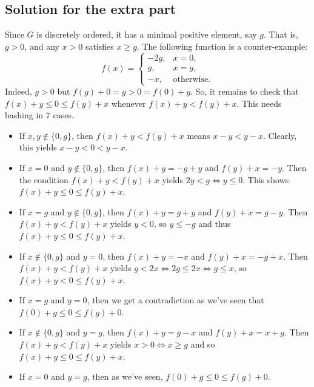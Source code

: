 \subsection*{Solution for the extra part}

Since $G$ is discretely ordered, it has a minimal positive element, say $g$.
That is, $g > 0$, and any $x > 0$ satisfies $x \geq g$.
The following function is a counter-example:
\[ f(x) = \begin{cases} -2g, & x = 0, \\ g, & x = g, \\ -x, & \text{otherwise.} \end{cases} \]
Indeed, $g > 0$ but $f(g) + 0 = g > 0 = f(0) + g$.
So, it remains to check that $f(x) + y \leq 0 \leq f(y) + x$ whenever $f(x) + y < f(y) + x$.
This needs bashing in $7$ cases.

\begin{itemize}
    
    \item 
    If $x, y \notin \{0, g\}$, then $f(x) + y < f(y) + x$ means $x - y < y - x$.
    Clearly, this yields $x - y < 0 < y - x$.

    \item 
    If $x = 0$ and $y \notin \{0, g\}$, then $f(x) + y = -g + y$ and $f(y) + x = -y$.
    Then the condition $f(x) + y < f(y) + x$ yields $2y < g \iff y \leq 0$.
    This shows $f(x) + y \leq 0 \leq f(y) + x$.

    \item 
    If $x = g$ and $y \notin \{0, g\}$, then $f(x) + y = g + y$ and $f(y) + x = g - y$.
    Then $f(x) + y < f(y) + x$ yields $y < 0$, so $y \leq -g$ and thus $f(x) + y \leq 0 \leq f(y) + x$.

    \item
    If $x \notin \{0, g\}$ and $y = 0$, then $f(x) + y = -x$ and $f(y) + x = -g + x$.
    Then $f(x) + y < f(y) + x$ yields $g < 2x \iff 2g \leq 2x \iff g \leq x$, so $f(x) + y < 0 \leq f(y) + x$.

    \item 
    If $x = g$ and $y = 0$, then we get a contradiction as we've seen that $f(0) + g \leq 0 \leq f(g) + 0$.

    \item
    If $x \notin \{0, g\}$ and $y = g$, then $f(x) + y = g - x$ and $f(y) + x = x + g$.
    Then $f(x) + y < f(y) + x$ yields $x > 0 \iff x \geq g$ and so $f(x) + y \leq 0 \leq f(y) + x$.

    \item
    If $x = 0$ and $y = g$, then as we've seen, $f(0) + g \leq 0 \leq f(g) + 0$.

\end{itemize}



